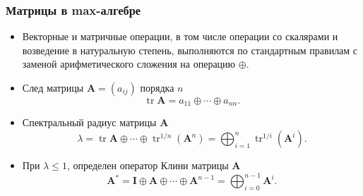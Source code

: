 \documentclass[ucs, notheorems, handout]{beamer}
\begin{document}
\begin{frame}
    \frametitle{Матрицы в max-алгебре}
    \begin{itemize}
        \item Векторные и матричные операции, в том числе операции со скалярами и возведение в натуральную степень, выполняются по стандартным правилам с заменой арифметического сложения на операцию $\oplus$. 
        
        
        
        
        \item След матрицы $\bm{A}=(a_{ij})$ порядка $n$
        $$\mathop\mathrm{tr}\bm{A}=a_{11}\oplus\cdots\oplus a_{nn}.$$

        \item Спектральный радиус матрицы $\bm{A}$
        \begin{equation*}
        \lambda
        =
        \mathop\mathrm{tr}\bm{A}\oplus\cdots\oplus\mathop\mathrm{tr}\nolimits^{1/n}(\bm{A}^{n})
        =
        \bigoplus_{i=1}^{n}{\mathop\mathrm{tr}}^{1/i}(\bm{A}^{i}).
        \end{equation*}

        \item При $\lambda\leq1$, определен оператор Клини матрицы $\bm{A}$
        \begin{equation*}
        \bm{A}^{\ast}
        =
        \bm{I}\oplus\bm{A}\oplus\cdots\oplus\bm{A}^{n-1}
        =
        \bigoplus_{i=0}^{n-1}\bm{A}^{i}.
        \end{equation*}
    \end{itemize}
\end{frame}
\end{document}
